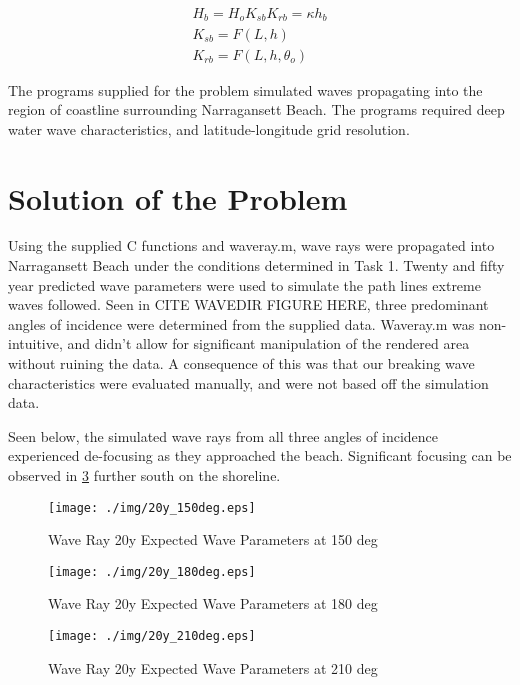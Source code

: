 \begin{align}
H_{b} = H_{o}K_{sb}K_{rb} = \kappa h_{b}
\\ K_{sb} = F(L,h)
\\K_{rb} = F(L,h,\theta_{o})
\label{eq:breaker_char}
\end{align}

The programs supplied for the problem simulated waves propagating into the region of coastline surrounding Narragansett Beach. The programs required deep water wave characteristics, and latitude-longitude grid resolution. 

\section{Solution of the Problem}

Using the supplied C functions and waveray.m, wave rays were propagated into Narragansett Beach under the conditions determined in Task 1. Twenty and fifty year predicted wave parameters were used to simulate the path lines extreme waves followed. Seen in CITE WAVEDIR FIGURE HERE, three predominant angles of incidence were determined from the supplied data. Waveray.m  was non-intuitive, and didn't allow for significant manipulation of the rendered area without ruining the data. A consequence of this was that our breaking wave characteristics were evaluated manually, and were not based off the simulation data.

Seen below, the simulated wave rays from all three angles of incidence experienced de-focusing as they approached the beach. Significant focusing can be observed in \ref{fig20y210deg} further south on the shoreline. 

\begin{figure}[H]
\centering
\texttt{[image: ./img/20y\_150deg.eps]}
\caption{Wave Ray 20y Expected Wave Parameters at 150 deg}
\label{fig:20y150deg}
\end{figure}

\begin{figure}[H]
\centering
\texttt{[image: ./img/20y\_180deg.eps]}
\caption{Wave Ray 20y Expected Wave Parameters at 180 deg}
\label{fig:20y180deg}
\end{figure}

\begin{figure}[H]
\centering
\texttt{[image: ./img/20y\_210deg.eps]}
\caption{Wave Ray 20y Expected Wave Parameters at 210 deg}
\label{fig20y210deg}
\end{figure}

